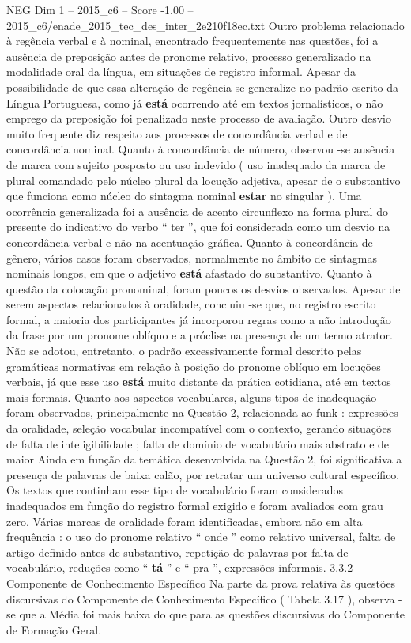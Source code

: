 \begin{textsample}{NEG Dim 1 – 2015\_c6 – Score -1.00 – 2015\_c6/enade\_2015\_tec\_des\_inter\_2e210f18ec.txt}
Outro problema relacionado à regência verbal e à nominal, encontrado frequentemente nas questões, foi a ausência de preposição antes de pronome relativo, processo generalizado na modalidade oral da língua, em situações de registro informal.
Apesar da possibilidade de que essa alteração de regência se generalize no padrão escrito da Língua Portuguesa, como já \textbf{está} ocorrendo até em textos jornalísticos, o não emprego da preposição foi penalizado neste processo de avaliação.
Outro desvio muito frequente diz respeito aos processos de concordância verbal e de concordância nominal.
Quanto à concordância de número, observou -se ausência de marca com sujeito posposto ou uso indevido ( uso inadequado da marca de plural comandado pelo núcleo plural da locução adjetiva, apesar de o substantivo que funciona como núcleo do sintagma nominal \textbf{estar} no singular ).
Uma ocorrência generalizada foi a ausência de acento circunflexo na forma plural do presente do indicativo do verbo “ ter ”, que foi considerada como um desvio na concordância verbal e não na acentuação gráfica.
Quanto à concordância de gênero, vários casos foram observados, normalmente no âmbito de sintagmas nominais longos, em que o adjetivo \textbf{está} afastado do substantivo.
Quanto à questão da colocação pronominal, foram poucos os desvios observados.
Apesar de serem aspectos relacionados à oralidade, concluiu -se que, no registro escrito formal, a maioria dos participantes já incorporou regras como a não introdução da frase por um pronome oblíquo e a próclise na presença de um termo atrator.
Não se adotou, entretanto, o padrão excessivamente formal descrito pelas gramáticas normativas em relação à posição do pronome oblíquo em locuções verbais, já que esse uso \textbf{está} muito distante da prática cotidiana, até em textos mais formais.
Quanto aos aspectos vocabulares, alguns tipos de inadequação foram observados, principalmente na Questão 2, relacionada ao funk : expressões da oralidade, seleção vocabular incompatível com o contexto, gerando situações de falta de inteligibilidade ; falta de domínio de vocabulário mais abstrato e de maior Ainda em função da temática desenvolvida na Questão 2, foi significativa a presença de palavras de baixa calão, por retratar um universo cultural específico.
Os textos que continham esse tipo de vocabulário foram considerados inadequados em função do registro formal exigido e foram avaliados com grau zero.
Várias marcas de oralidade foram identificadas, embora não em alta frequência : o uso do pronome relativo “ onde ” como relativo universal, falta de artigo definido antes de substantivo, repetição de palavras por falta de vocabulário, reduções como “ \textbf{tá} ” e “ pra ”, expressões informais. 3.3.2 Componente de Conhecimento Específico Na parte da prova relativa às questões discursivas do Componente de Conhecimento Específico ( Tabela 3.17 ), observa -se que a Média foi mais baixa do que para as questões discursivas do Componente de Formação Geral.

\end{textsample}
